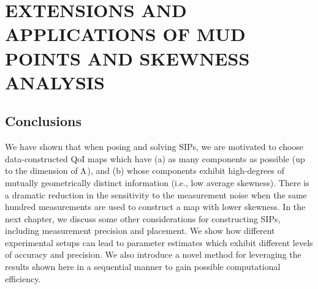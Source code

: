 \chapter{\uppercase{Extensions and Applications of MUD Points and Skewness Analysis} \label{chapter:vector-valued}}




\FloatBarrier

\section{Conclusions}

We have shown that when posing and solving SIPs, we are motivated to choose data-constructed QoI maps which have (a) as many components as possible (up to the dimension of ${\Lambda}$), and (b) whose components exhibit high-degrees of mutually geometrically distinct information (i.e., low average skewness).
There is a dramatic reduction in the sensitivity to the measurement noise when the same hundred measurements are used to construct a map with lower skewness.
In the next chapter, we discuss some other considerations for constructing SIPs, including measurement precision and placement.
We show how different experimental setups can lead to parameter estimates which exhibit different levels of accuracy and precision.
We also introduce a novel method for leveraging the results shown here in a sequential manner to gain possible computational efficiency.
